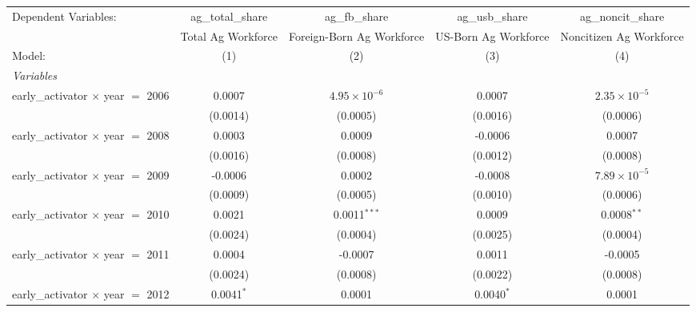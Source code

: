 
\begingroup
\centering
\begin{tabular}{lcccc}
   \tabularnewline \midrule \midrule
   Dependent Variables:                      & ag\_total\_share   & ag\_fb\_share             & ag\_usb\_share       & ag\_noncit\_share\\    
                                             & Total Ag Workforce & Foreign-Born Ag Workforce & US-Born Ag Workforce & Noncitizen Ag Workforce \\   
   Model:                                    & (1)                & (2)                       & (3)                  & (4)\\  
   \midrule
   \emph{Variables}\\
   early\_activator $\times$ year $=$ 2006   & 0.0007             & $4.95\times 10^{-6}$      & 0.0007               & $2.35\times 10^{-5}$\\    
                                             & (0.0014)           & (0.0005)                  & (0.0016)             & (0.0006)\\   
   early\_activator $\times$ year $=$ 2008   & 0.0003             & 0.0009                    & -0.0006              & 0.0007\\   
                                             & (0.0016)           & (0.0008)                  & (0.0012)             & (0.0008)\\   
   early\_activator $\times$ year $=$ 2009   & -0.0006            & 0.0002                    & -0.0008              & $7.89\times 10^{-5}$\\    
                                             & (0.0009)           & (0.0005)                  & (0.0010)             & (0.0006)\\   
   early\_activator $\times$ year $=$ 2010   & 0.0021             & 0.0011$^{***}$            & 0.0009               & 0.0008$^{**}$\\   
                                             & (0.0024)           & (0.0004)                  & (0.0025)             & (0.0004)\\   
   early\_activator $\times$ year $=$ 2011   & 0.0004             & -0.0007                   & 0.0011               & -0.0005\\   
                                             & (0.0024)           & (0.0008)                  & (0.0022)             & (0.0008)\\   
   early\_activator $\times$ year $=$ 2012   & 0.0041$^{*}$       & 0.0001                    & 0.0040$^{*}$         & 0.0001\\   

\end{tabular}
